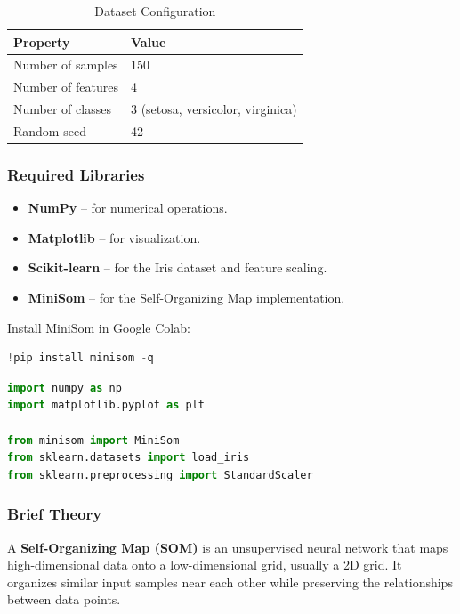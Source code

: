 \documentclass[a4paper,11pt]{article}
\begin{document}
\begin{itemize}
\begin{table}[H]
\centering
\caption{Dataset Configuration}
\begin{tabular}{ll}
\toprule
\textbf{Property} & \textbf{Value} \\
\midrule
Number of samples  & 150 \\
Number of features & 4 \\
Number of classes  & 3 (setosa, versicolor, virginica) \\
Random seed        & 42 \\
\bottomrule
\end{tabular}
\end{table}

\subsubsection{Required Libraries}
\begin{itemize}
    \item \textbf{NumPy} -- for numerical operations.
    \item \textbf{Matplotlib} -- for visualization.
    \item \textbf{Scikit-learn} -- for the Iris dataset and feature scaling.
    \item \textbf{MiniSom} -- for the Self-Organizing Map implementation.
\end{itemize}

Install MiniSom in Google Colab:
\begin{lstlisting}[language=Python, caption={Install minisom}]
!pip install minisom -q
\end{lstlisting}

\begin{lstlisting}[language=Python, caption={Required Imports}]
import numpy as np
import matplotlib.pyplot as plt

from minisom import MiniSom
from sklearn.datasets import load_iris
from sklearn.preprocessing import StandardScaler
\end{lstlisting}

\subsubsection{Brief Theory}
A \textbf{Self-Organizing Map (SOM)} is an unsupervised neural network that maps high-dimensional data onto a low-dimensional grid, usually a 2D grid. It organizes similar input samples near each other while preserving the relationships between data points.


\end{itemize}
\end{document}
